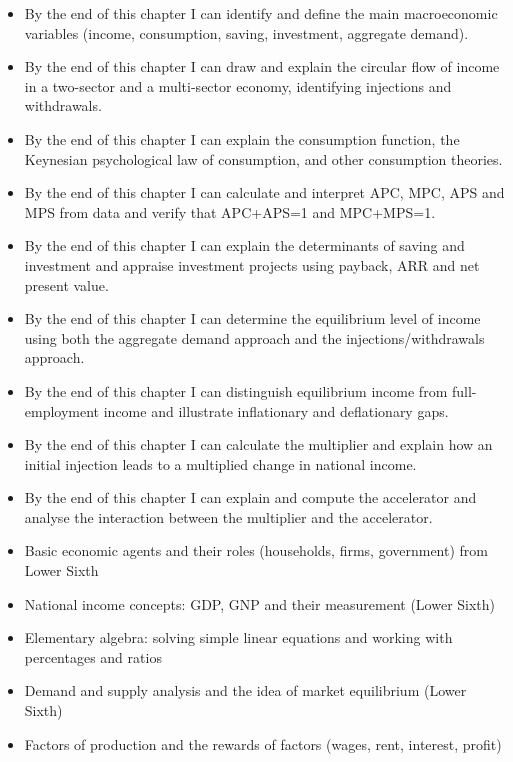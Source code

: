 \documentclass[11pt]{article}
\begin{document}
\begin{objectifs}
\begin{itemize}
\item By the end of this chapter I can identify and define the main macroeconomic variables (income, consumption, saving, investment, aggregate demand).
\item By the end of this chapter I can draw and explain the circular flow of income in a two-sector and a multi-sector economy, identifying injections and withdrawals.
\item By the end of this chapter I can explain the consumption function, the Keynesian psychological law of consumption, and other consumption theories.
\item By the end of this chapter I can calculate and interpret APC, MPC, APS and MPS from data and verify that APC+APS=1 and MPC+MPS=1.
\item By the end of this chapter I can explain the determinants of saving and investment and appraise investment projects using payback, ARR and net present value.
\item By the end of this chapter I can determine the equilibrium level of income using both the aggregate demand approach and the injections/withdrawals approach.
\item By the end of this chapter I can distinguish equilibrium income from full-employment income and illustrate inflationary and deflationary gaps.
\item By the end of this chapter I can calculate the multiplier and explain how an initial injection leads to a multiplied change in national income.
\item By the end of this chapter I can explain and compute the accelerator and analyse the interaction between the multiplier and the accelerator.
\end{itemize}
\end{objectifs}

\begin{prerequis}
\begin{itemize}
\item Basic economic agents and their roles (households, firms, government) from Lower Sixth
\item National income concepts: GDP, GNP and their measurement (Lower Sixth)
\item Elementary algebra: solving simple linear equations and working with percentages and ratios
\item Demand and supply analysis and the idea of market equilibrium (Lower Sixth)
\item Factors of production and the rewards of factors (wages, rent, interest, profit)
\end{itemize}
\end{prerequis}
\end{document}
